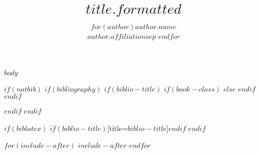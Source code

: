 \documentclass[$if(documentclass)$$documentclass$$else$article$endif$$if(classoption)$,$classoption$$endif$]{jss}
\author{
$for(author)$$author.name$\\$author.affiliation$$sep$ \And $endfor$
}
\title{$title.formatted$}
\begin{document}
$body$

$if(natbib)$
$if(bibliography)$
$if(biblio-title)$
$if(book-class)$
\renewcommand\bibname{$biblio-title$}
$else$
\renewcommand\refname{$biblio-title$}
$endif$
$endif$

$endif$
$endif$

$if(biblatex)$
\printbibliography$if(biblio-title)$[title=$biblio-title$]$endif$
$endif$

$for(include-after)$
$include-after$
$endfor$
\end{document}
